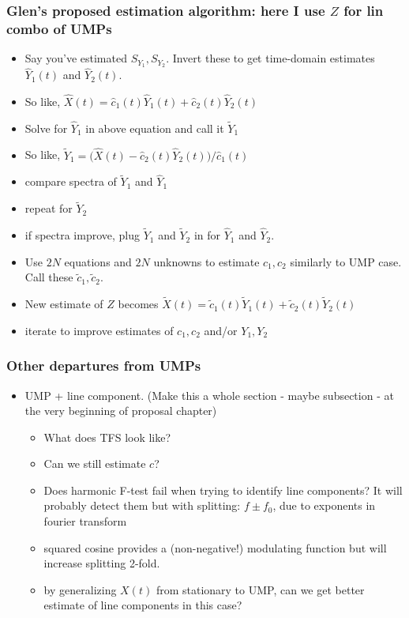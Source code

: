 \documentclass{article}
\begin{document}
\subsubsection*{Glen's proposed estimation algorithm: here I use $Z$ for lin combo of UMPs}
\begin{itemize}
    \item Say you've estimated $S_{Y_1}, S_{Y_2}$. Invert these to get time-domain estimates $\hat Y_1(t)$ and $\hat Y_2(t)$.
    \item So like, 
        $\hat X(t) = \hat c_1(t)\hat Y_1(t) + \hat c_2(t)\hat Y_2(t)$ \\
    \item Solve for $\hat Y_1$ in above equation and call it $\tilde Y_1$
    \item So like, 
        $\tilde Y_1 = \big(\hat X(t) - \hat c_2(t)\hat Y_2(t)\big)/\hat c_1(t)$
    \item compare spectra of $\tilde Y_1$ and $\hat Y_1$\\
    \item repeat for $\tilde Y_2$
    \item if spectra improve, plug $\tilde Y_1$ and $\tilde Y_2$ in for $\hat Y_1$ and $\hat Y_2$.\\
    \item Use $2N$ equations and $2N$ unknowns to estimate $c_1, c_2$ similarly to UMP case. Call these $\tilde c_1, \tilde c_2$.
    \item New estimate of $Z$ becomes 
        $\tilde X(t) = \tilde c_1(t)\tilde Y_1(t) + \tilde c_2(t)\tilde Y_2(t)$
    \item iterate to improve estimates of $c_1, c_2$ and/or $Y_1, Y_2$
\end{itemize}
\subsubsection*{Other departures from UMPs}
\begin{itemize}
    \item UMP + line component. (Make this a whole section - maybe subsection - at the very beginning of proposal chapter)
    \begin{itemize}
        \item What does TFS look like? 
        \item Can we still estimate $c$?
        \item Does harmonic F-test fail when trying to identify line components? It will probably detect them but with splitting: $f \pm f_0$, due to exponents in fourier transform
        \item squared cosine provides a (non-negative!) modulating function but will increase splitting 2-fold.
        \item by generalizing $X(t)$ from stationary to UMP, can we get better estimate of line components in this case?
    \end{itemize}
\end{itemize}
\end{document}
